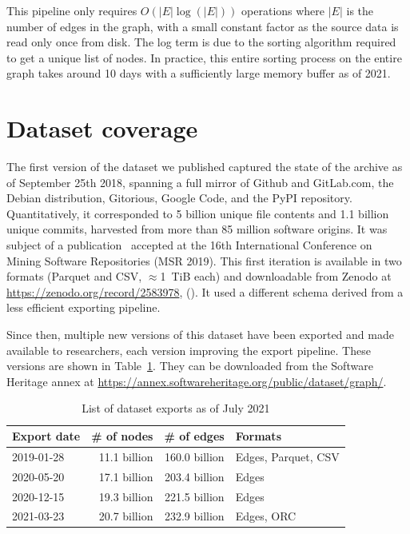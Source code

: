 This pipeline only requires $O(|E| \log(|E|))$ operations where $|E|$ is the
number of edges in the graph, with a small constant factor as the source data
is read only once from disk. The log term is due to the sorting algorithm
required to get a unique list of nodes. In practice, this entire sorting
process on the entire graph takes around 10 days with a sufficiently large
memory buffer as of 2021.

\section{Dataset coverage}

The first version of the dataset we published captured the state of the \SWH{}
archive as of September 25th 2018, spanning a full mirror of Github and
GitLab.com, the Debian distribution, Gitorious, Google Code, and the PyPI
repository. Quantitatively, it corresponded to 5 billion unique file contents
and 1.1 billion unique commits, harvested from more than 85 million software
origins. It was subject of a publication~\cite{swh-msr2019-dataset} accepted at the
16th International Conference on Mining Software Repositories (MSR 2019).
This first iteration is available in two formats (Parquet and CSV,
$\approx$1~TiB each) and downloadable from Zenodo at
\url{https://zenodo.org/record/2583978}, (). It
used a different schema derived from a less efficient exporting pipeline.

Since then, multiple new versions of this dataset have been exported and made
available to researchers, each version improving the export pipeline. These
versions are shown in Table~\ref{tab:swh-dataset-exports}. They can be
downloaded from the Software Heritage annex at
\url{https://annex.softwareheritage.org/public/dataset/graph/}.

\begin{table}
  \centering
    \caption{List of dataset exports as of July 2021}%
    \label{tab:swh-dataset-exports}
    \begin{tabular}{l r r l}
        \hline\textbf{Export date} & \textbf{\# of nodes} & \textbf{\# of edges} & \textbf{Formats} \\ \hline

        2019-01-28 & 11.1 billion & 160.0 billion & Edges, Parquet, CSV \\ \hline
        2020-05-20 & 17.1 billion & 203.4 billion & Edges \\ \hline
        2020-12-15 & 19.3 billion & 221.5 billion & Edges \\ \hline
        2021-03-23 & 20.7 billion & 232.9 billion & Edges, ORC \\ \hline
    \end{tabular}
\end{table}

